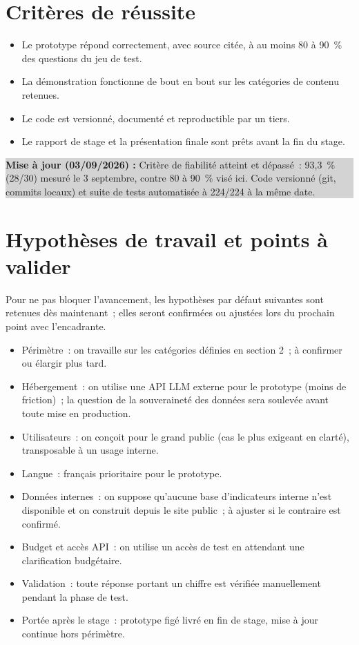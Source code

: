 \documentclass[11pt,a4paper]{article}
\newcommand{\majcadrage}[1]{%
\par\vspace{0.35cm}
\noindent\colorbox{lightgrey}{%
\begin{minipage}{\dimexpr\linewidth-2\fboxsep}
\vspace{0.15cm}
\textbf{\color{gold}Mise \`a jour (03/09/2026) :} #1
\vspace{0.15cm}
\end{minipage}%
}
\vspace{0.35cm}
}
\begin{document}
\section{Crit\`eres de r\'eussite}
\begin{itemize}
\item Le prototype r\'epond correctement, avec source cit\'ee, \`a au moins 80 \`a 90~\% des questions du jeu de test.
\item La d\'emonstration fonctionne de bout en bout sur les cat\'egories de contenu retenues.
\item Le code est versionn\'e, document\'e et reproductible par un tiers.
\item Le rapport de stage et la pr\'esentation finale sont pr\^ets avant la fin du stage.
\end{itemize}

\majcadrage{Crit\`ere de fiabilit\'e atteint et d\'epass\'e~: 93,3~\% (28/30) mesur\'e le 3 septembre, contre 80 \`a 90~\% vis\'e ici. Code versionn\'e (git, commits locaux) et suite de tests automatis\'ee \`a 224/224 \`a la m\^eme date.}

\section{Hypoth\`eses de travail et points \`a valider}
Pour ne pas bloquer l'avancement, les hypoth\`eses par d\'efaut suivantes sont retenues d\`es maintenant~; elles seront confirm\'ees ou ajust\'ees lors du prochain point avec l'encadrante.

\begin{itemize}
\item P\'erim\`etre~: on travaille sur les cat\'egories d\'efinies en section 2~; \`a confirmer ou \'elargir plus tard.
\item H\'ebergement~: on utilise une API LLM externe pour le prototype (moins de friction)~; la question de la souverainet\'e des donn\'ees sera soulev\'ee avant toute mise en production.
\item Utilisateurs~: on con\c{c}oit pour le grand public (cas le plus exigeant en clart\'e), transposable \`a un usage interne.
\item Langue~: fran\c{c}ais prioritaire pour le prototype.
\item Donn\'ees internes~: on suppose qu'aucune base d'indicateurs interne n'est disponible et on construit depuis le site public~; \`a ajuster si le contraire est confirm\'e.
\item Budget et acc\`es API~: on utilise un acc\`es de test en attendant une clarification budg\'etaire.
\item Validation~: toute r\'eponse portant un chiffre est v\'erifi\'ee manuellement pendant la phase de test.
\item Port\'ee apr\`es le stage~: prototype fig\'e livr\'e en fin de stage, mise \`a jour continue hors p\'erim\`etre.
\end{itemize}
\end{document}
